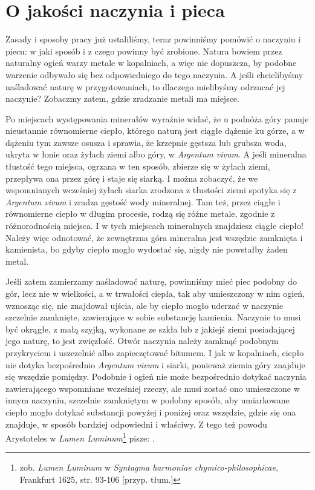 \section{O jakości naczynia i pieca}

Zasady i sposoby pracy już ustaliliśmy, teraz powinniśmy pomówić o naczyniu i piecu: w jaki sposób i z czego powinny być zrobione. Natura bowiem przez naturalny ogień warzy metale w kopalniach, a więc nie dopuszcza, by podobne warzenie odbywało się bez odpowiedniego do tego naczynia. A jeśli chcielibyśmy naśladować naturę w przygotowaniach, to dlaczego mielibyśmy odrzucać jej naczynie? Zobaczmy zatem, gdzie zradzanie metali ma miejsce. 

Po miejscach występowania minerałów wyraźnie widać, że u podnóża góry panuje nieustannie równomierne ciepło, którego naturą jest ciągłe dążenie ku górze, a w dążeniu tym zawsze osusza i sprawia, że krzepnie gęstsza lub grubsza woda, ukryta w łonie oraz żyłach ziemi albo góry, w \textit{Argentum vivum}. A jeśli mineralna tłustość tego miejsca, ogrzana w ten sposób, zbierze się w żyłach ziemi, przepływa ona przez górę i staje się siarką. I można zobaczyć, że we wspomnianych wcześniej żyłach siarka zrodzona z tłustości ziemi spotyka się z \textit{Argentum vivum} i zradza gęstość wody mineralnej. Tam też, przez ciągłe i równomierne ciepło w długim procesie, rodzą się różne metale, zgodnie z różnorodnością miejsca. I w tych miejscach mineralnych znajdziesz ciągłe ciepło! Należy więc odnotować, że zewnętrzna góra mineralna jest wszędzie zamknięta i kamienista, bo gdyby ciepło mogło wydostać się, nigdy nie powstałby żaden metal.

Jeśli zatem zamierzamy naśladować naturę, powinniśmy mieć piec podobny do gór, lecz nie w wielkości, a w trwałości ciepła, tak aby umieszczony w nim ogień, wznosząc się, nie znajdował ujścia, ale by ciepło mogło uderzać w naczynie szczelnie zamknięte, zawierające w sobie substancję kamienia. Naczynie to musi być okrągłe, z małą szyjką, wykonane ze szkła lub z jakiejś ziemi posiadającej jego naturę, to jest zwięzłość. Otwór naczynia należy zamknąć podobnym przykryciem i uszczelnić albo zapieczętować bitumem. I jak w kopalniach, ciepło nie dotyka bezpośrednio \textit{Argentum vivum} i siarki, ponieważ ziemia góry znajduje się wszędzie pomiędzy. Podobnie i ogień nie może bezpośrednio dotykać naczynia zawierającego wspomniane wcześniej rzeczy, ale musi zostać ono umieszczone w innym naczyniu, szczelnie zamkniętym w podobny sposób, aby umiarkowane ciepło mogło dotykać substancji powyżej i poniżej oraz wszędzie, gdzie się ona znajduje, w sposób bardziej odpowiedni i właściwy. Z tego też powodu Arystoteles w \textit{Lumen Luminum}\footnote{zob. \textit{Lumen Luminum} w \textit{Syntagma harmoniae chymico-philosophicae}, Frankfurt 1625, str. 93-106 [przyp. tłum.]} pisze: .

